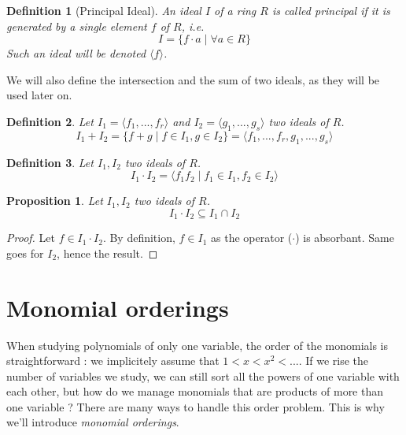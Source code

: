 \documentclass{article}
\newtheorem{definition}{Definition}[section]
\newtheorem{proposition}{Proposition}[section]
\begin{document}
\begin{definition}[Principal Ideal]
    An ideal $I$ of a ring $R$ is called principal if it is generated by a single element $f$ of $R$, \textit{i.e.}
    \begin{displaymath}
        I = \{f \cdot a \mid \forall a \in R\}
    \end{displaymath}
    Such an ideal will be denoted $\langle f \rangle$.
\end{definition}

We will also define the intersection and the sum of two ideals, as they will be used later on.


\begin{definition}
    Let $I_{1} = \langle f_{1}, ..., f_{r} \rangle$ and  $I_{2} = \langle g_{1}, ..., g_{s} \rangle $ two ideals of $R$. 
    \begin{displaymath}
        I_{1} + I_{2} = \{f + g \mid f \in I_{1}, g \in I_{2}\} = \langle f_{1}, ..., f_{r}, g_{1}, ..., g_{s} \rangle 
    \end{displaymath}
\end{definition}

\begin{definition}
    Let $I_{1}, I_{2}$ two ideals of $R$. 
    \begin{displaymath}
        I_{1} \cdot I_{2} = \langle f_{1}f_{2} \mid f_{1} \in I_{1}, f_{2} \in I_{2} \rangle
    \end{displaymath}
\end{definition}

\begin{proposition}
    Let $I_{1}, I_{2}$ two ideals of $R$. 
    \begin{displaymath}
        I_{1} \cdot I_{2} \subseteq I_{1} \cap I_{2}
    \end{displaymath}
\end{proposition}

\begin{proof}
    Let $f \in I_{1} \cdot I_{2}$. By definition, $f \in I_{1}$ as the operator ($\cdot$) is absorbant. Same goes for $I_{2}$, hence the result.
\end{proof}

\section{Monomial orderings}

When studying polynomials of only one variable, the order of the monomials is straightforward : we implicitely assume that $1 < x < x^{2} < ...$. If we rise the number of variables we study, we can still sort all the powers of one variable with each other, but how do we manage monomials that are products of more than one variable ? There are many ways to handle this order problem. This is why we'll introduce \textit{monomial orderings}.
\end{document}
